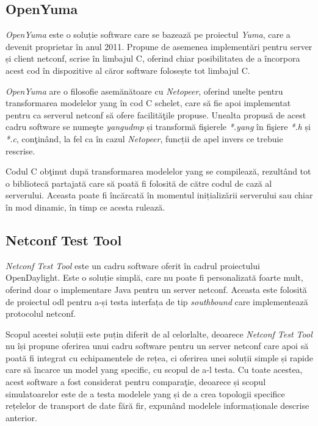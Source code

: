 \subsection{OpenYuma}

\textit{OpenYuma} este o soluție software care se bazează pe proiectul \textit{Yuma}, care a devenit proprietar în anul 2011. Propune de asemenea implementări pentru server și client \gls{netconf}, scrise în limbajul C, oferind chiar posibilitatea de a încorpora acest cod în dispozitive al căror software folosește tot limbajul C.

\textit{OpenYuma} are o filosofie asemănătoare cu \textit{Netopeer}, oferind unelte pentru transformarea modelelor \gls{yang} în cod C schelet, care să fie apoi implementat pentru ca serverul \gls{netconf} să ofere facilităţile propuse. Unealta propusă de acest cadru software se numeşte \textit{yangudmp} și transformă fişierele \textit{*.yang} în fişiere \textit{*.h} și \textit{*.c}, conţinând, la fel ca în cazul \textit{Netopeer}, funcții de apel invers ce trebuie rescrise.

Codul C obţinut după transformarea modelelor \gls{yang} se compilează, rezultând tot o bibliotecă partajată care să poată fi folosită de către codul de cază al serverului. Aceasta poate fi încărcată în momentul inițializării serverului sau chiar în mod dinamic, în timp ce acesta rulează.

\subsection{Netconf Test Tool}

\textit{Netconf Test Tool} este un cadru software oferit în cadrul proiectului OpenDaylight. Este o soluție simplă, care nu poate fi personalizată foarte mult, oferind doar o implementare Java pentru un server \gls{netconf}. Aceasta este folosită de proiectul \gls{odl} pentru a-și testa interfața de tip \textit{southbound} care implementează protocolul \gls{netconf}.

Scopul acestei soluții este puțin diferit de al celorlalte, deoarece \textit{Netconf Test Tool} nu își propune oferirea unui cadru software pentru un server \gls{netconf} care apoi să poată fi integrat cu echipamentele de rețea, ci oferirea unei soluții simple și rapide care să încarce un model \gls{yang} specific, cu scopul de a-l testa. Cu toate acestea, acest software a fost considerat pentru comparaţie, deoarece și scopul simulatoarelor este de a testa modelele \gls{yang} și de a crea topologii specifice rețelelor de transport de date fără fir, expunând modelele informaționale descrise anterior.

